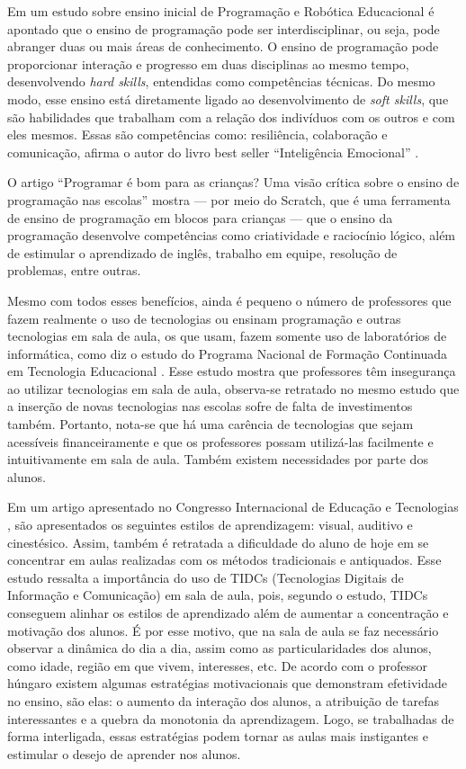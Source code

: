 Em um estudo sobre ensino inicial de Programação e Robótica Educacional \cite{antonello_cardoso_2015} é apontado que o ensino de programação pode ser interdisciplinar, ou seja, pode abranger duas ou mais áreas de conhecimento. O ensino de programação pode proporcionar interação e progresso em duas disciplinas ao mesmo tempo, desenvolvendo \textit{hard skills}, entendidas como competências técnicas. Do mesmo modo, esse ensino está diretamente ligado ao desenvolvimento de \textit{soft skills}, que são habilidades que trabalham com a relação dos indivíduos com os outros e com eles mesmos. Essas são competências como: resiliência, colaboração e comunicação, afirma o autor do livro best seller “Inteligência Emocional” \cite{goleman_2012}.

O artigo “Programar é bom para as crianças? Uma visão crítica sobre o ensino de programação nas escolas” \cite{geraldes_2014} mostra — por meio do Scratch, que é uma ferramenta de ensino de programação em blocos para crianças — que o ensino da programação desenvolve competências como criatividade e raciocínio lógico, além de estimular o aprendizado de inglês, trabalho em equipe, resolução de problemas, entre outras.

Mesmo com todos esses benefícios, ainda é pequeno o número de professores que fazem realmente o uso de tecnologias ou ensinam programação e outras tecnologias em sala de aula, os que usam, fazem somente uso de laboratórios de informática, como diz o estudo do Programa Nacional de Formação Continuada em Tecnologia Educacional \cite{suenia_andre_2012}. Esse estudo mostra que professores têm insegurança ao utilizar tecnologias em sala de aula, observa-se retratado no mesmo estudo que a inserção de novas tecnologias nas escolas sofre de falta de investimentos também. Portanto, nota-se que há uma carência de tecnologias que sejam acessíveis financeiramente e que os professores possam utilizá-las facilmente e intuitivamente em sala de aula. Também existem necessidades por parte dos alunos.

Em um artigo apresentado no Congresso Internacional de Educação e Tecnologias \cite{lima_queiroz_santana_2018}, são apresentados os seguintes estilos de aprendizagem: visual, auditivo e cinestésico. Assim, também é retratada a dificuldade do aluno de hoje em se concentrar em aulas realizadas com os métodos tradicionais e antiquados. Esse estudo ressalta a importância do uso de TIDCs (Tecnologias Digitais de Informação e Comunicação) em sala de aula, pois, segundo o estudo, TIDCs conseguem alinhar os estilos de aprendizado além de aumentar a concentração e motivação dos alunos. É por esse motivo, que na sala de aula se faz necessário observar a dinâmica do dia a dia, assim como as particularidades dos alunos, como idade, região em que vivem, interesses, etc. De acordo com o professor húngaro \cite[p. 81]{dornyei_2001} existem algumas estratégias motivacionais que demonstram efetividade no ensino, são elas: o aumento da interação dos alunos, a atribuição de tarefas interessantes e a quebra da monotonia da aprendizagem. Logo, se trabalhadas de forma interligada, essas estratégias podem tornar as aulas mais instigantes e estimular o desejo de aprender nos alunos.

